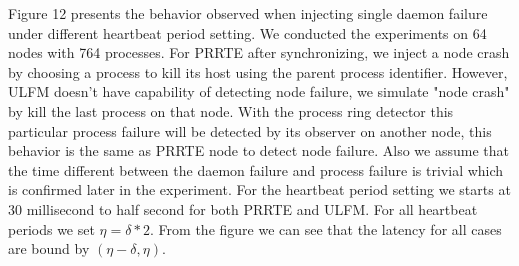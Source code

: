 \documentclass[sigconf]{acmart}
\begin{document}
Figure 12 presents the behavior observed when injecting single daemon failure under different heartbeat period setting. We conducted the experiments on 64 nodes with 764 processes. For PRRTE after synchronizing, we inject a node crash by choosing a process to kill its host using the parent process identifier. However, ULFM doesn't have capability of detecting node failure, we simulate "node crash" by kill the last process on that node. With the process ring detector this particular process failure will be detected by its observer on another node, this behavior is the same as PRRTE node to detect node failure. Also we assume that the time different between the daemon failure and process failure is trivial which is confirmed later in the experiment. For the heartbeat period setting we starts at 30 millisecond to half second for both PRRTE and ULFM. For all heartbeat periods we set $ \eta = \delta * 2 $. From the figure we can see that the latency for all cases are bound by $ (\eta - \delta,\eta) $.
\end{document}
